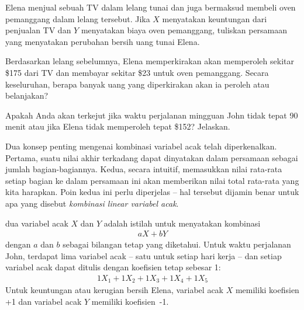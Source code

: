 \begin{exercisewrap}
\begin{nexercise}
\label{elenaIsSellingATVAndBuyingAToasterOvenAtAnAuction}%
Elena menjual sebuah TV dalam lelang tunai dan juga bermaksud membeli oven pemanggang dalam lelang tersebut. Jika $X$ menyatakan keuntungan dari penjualan TV dan $Y$ menyatakan biaya oven pemanggang, tuliskan persamaan yang menyatakan perubahan bersih uang tunai Elena.\footnotemark
\end{nexercise}
\end{exercisewrap}

\begin{exercisewrap}
\begin{nexercise}
Berdasarkan lelang sebelumnya, Elena memperkirakan akan memperoleh sekitar \$175 dari TV dan membayar sekitar \$23 untuk oven pemanggang. Secara keseluruhan, berapa banyak uang yang diperkirakan akan ia peroleh atau belanjakan?\footnotemark
\end{nexercise}
\end{exercisewrap}

\begin{exercisewrap}
\begin{nexercise} \label{explainWhyThereIsUncertaintyInTheSum}
Apakah Anda akan terkejut jika waktu perjalanan mingguan John tidak tepat 90 menit atau jika Elena tidak memperoleh tepat \$152? Jelaskan.\footnotemark
\end{nexercise}
\end{exercisewrap}

Dua konsep penting mengenai kombinasi variabel acak telah diperkenalkan. Pertama, suatu nilai akhir terkadang dapat dinyatakan dalam persamaan sebagai jumlah bagian-bagiannya. Kedua, secara intuitif, memasukkan nilai rata-rata setiap bagian ke dalam persamaan ini akan memberikan nilai total rata-rata yang kita harapkan. Poin kedua ini perlu diperjelas -- hal tersebut dijamin benar untuk apa yang disebut \emph{kombinasi linear variabel acak}.

 dua variabel acak $X$ dan $Y$ adalah istilah untuk menyatakan kombinasi
\begin{align*}
aX + bY
\end{align*}
dengan $a$ dan $b$ sebagai bilangan tetap yang diketahui. Untuk waktu perjalanan John, terdapat lima variabel acak -- satu untuk setiap hari kerja -- dan setiap variabel acak dapat ditulis dengan koefisien tetap sebesar 1:
\begin{align*}
1X_1 + 1 X_2 + 1 X_3 + 1 X_4 + 1 X_5
\end{align*}
Untuk keuntungan atau kerugian bersih Elena, variabel acak $X$ memiliki
koefisien +1 dan variabel acak $Y$ memiliki
koefisien~-1.

